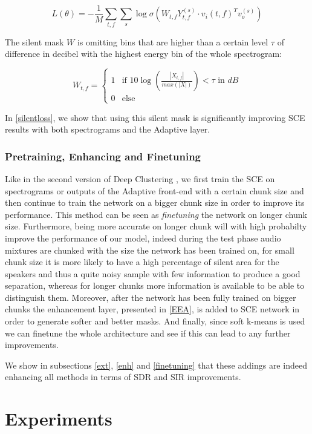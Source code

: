 \documentclass[master, tikz, final,11pt, dvipdfmx]{iscs-thesis}
\begin{document}
\[L(\theta) = - \frac{1}{M} \sum_{t,f} \sum_{s} \log \sigma(W_{t,f}Y_{t,f}^{(s)}  \cdot v_i(t,f)^{T} v_o^{(s)})\]

The silent mask $W$ is omitting bins that are higher than a certain level $\tau$ of difference in decibel with the highest energy bin of the whole spectrogram:

$$
W_{t,f} =  \left\{
    \begin{array}{ll}
        1 & \mbox{if } 10\log (\frac{|X_{t,f}|}{max(|X|)}) < \tau \mbox{ in } dB  \\
        0 & \mbox{else}
    \end{array}
\right.
$$

In \autoref{silentloss}, we show that using this silent mask is significantly improving SCE results with both spectrograms and the Adaptive layer.

\subsection{Pretraining, Enhancing and Finetuning}

Like in the second version of Deep Clustering \cite{DPCLV2}, we first train the SCE on spectrograms or outputs of the Adaptive front-end with a certain chunk size and then continue to train the network on a bigger chunk size in order to improve its performance. This method can be seen as \textit{finetuning} the network on longer chunk size. Furthermore, being more accurate on longer chunk will with high probabilty improve the performance of our model, indeed during the test phase audio mixtures are chunked with the size the network has been trained on, for small chunk size it is more likely to have a high percentage of silent area for the speakers and thus a quite noisy sample with few information to produce a good separation, whereas for longer chunks more information is available to be able to distinguish them.
Moreover, after the network has been fully trained on bigger chunks the enhancement layer, presented in \autoref{EEA}, is added to SCE network in order to generate softer and better masks. And finally, since soft k-means is used we can finetune the whole architecture and see if this can lead to any further improvements.

We show in subsections \ref{ext}, \ref{enh} and \ref{finetuning} that these addings are indeed enhancing all methods in terms of SDR and SIR improvements.


\chapter{Experiments}
\label{exp}
\end{document}
